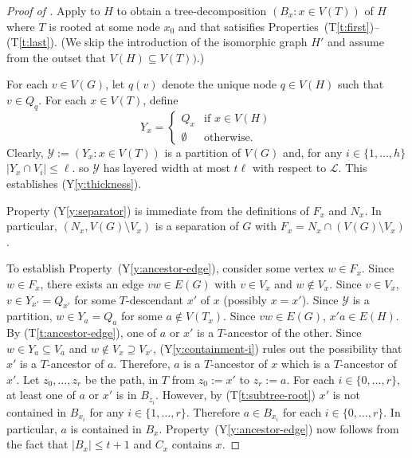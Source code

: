 \documentclass{patmorin}
\newcommand{\tref}[1]{(T\ref{t:#1})}
\newcommand{\yref}[1]{(Y\ref{y:#1})}
\begin{document}
\begin{proof}[Proof of ]
  Apply  to $H$ to obtain a tree-decomposition $(B_x: x\in V(T))$ of $H$ where $T$ is rooted at some node $x_0$ and that satisifies Properties~\tref{first}--\tref{last}. (We skip the introduction of the isomorphic graph $H'$ and assume from the outset that $V(H)\subseteq V(T))$.)

  For each $v\in V(G)$, let $q(v)$ denote the unique node $q\in V(H)$ such that $v\in Q_q$.  For each $x\in V(T)$, define
  \[
      Y_x = \begin{cases} Q_x & \text{if $x\in V(H)$} \\
                          \emptyset & \text{otherwise} .
            \end{cases}
  \]
  Clearly, $\mathcal{Y}:=(Y_x:x\in V(T))$ is a partition of $V(G)$ and, for any $i\in\{1,\ldots,h\}$ $|Y_x\cap V_i|\le \ell$.
  so $\mathcal{Y}$ has layered width at most $t\ell$ with respect to $\mathcal{L}$.  This establishes \yref{thickness}. 

  Property \yref{separator} is immediate from the definitions of $F_x$ and $N_x$.  In particular, $(N_x,V(G)\setminus V_x)$ is a separation of $G$ with $F_x=N_x\cap(V(G)\setminus V_x)$. 

  To establish Property~\yref{ancestor-edge}, consider some vertex $w\in F_x$.  Since $w\in F_x$, there exists an edge $vw\in E(G)$ with $v\in V_x$ and $w\not\in V_x$.  Since $v\in V_x$, $v\in Y_{x'}=Q_{x'}$ for some $T$-descendant $x'$ of $x$ (possibly $x=x'$). Since $\mathcal{Y}$ is a partition, $w\in Y_{a}=Q_a$ for some $a\not\in V(T_x)$.  Since $vw\in E(G)$, $x'a\in E(H)$.  By \tref{ancestor-edge}, one of $a$ or $x'$ is a $T$-ancestor of the other. Since $w\in Y_a\subseteq V_a$ and $w\not\in V_x\supseteq V_{x'}$, \yref{containment-i} rules out the possibility that $x'$ is a $T$-ancestor of $a$. Therefore, $a$ is a $T$-ancestor of $x$ which is a $T$-ancestor of $x'$.  Let $z_0,\ldots,z_r$ be the path, in $T$ from $z_0:=x'$ to $z_r:=a$.  For each $i\in\{0,\ldots,r\}$, at least one of $a$ or $x'$ is in $B_{z_i}$.  However, by \tref{subtree-root} $x'$ is not contained in $B_{x_i}$ for any $i\in\{1,\ldots,r\}$.  Therefore $a\in B_{x_i}$ for each $i\in\{0,\ldots,r\}$.  In particular, $a$ is contained in $B_x$.
  Property~\yref{ancestor-edge} now follows from the fact that $|B_x|\le t+1$ and $C_x$ contains $x$.
\end{proof}
\end{document}
